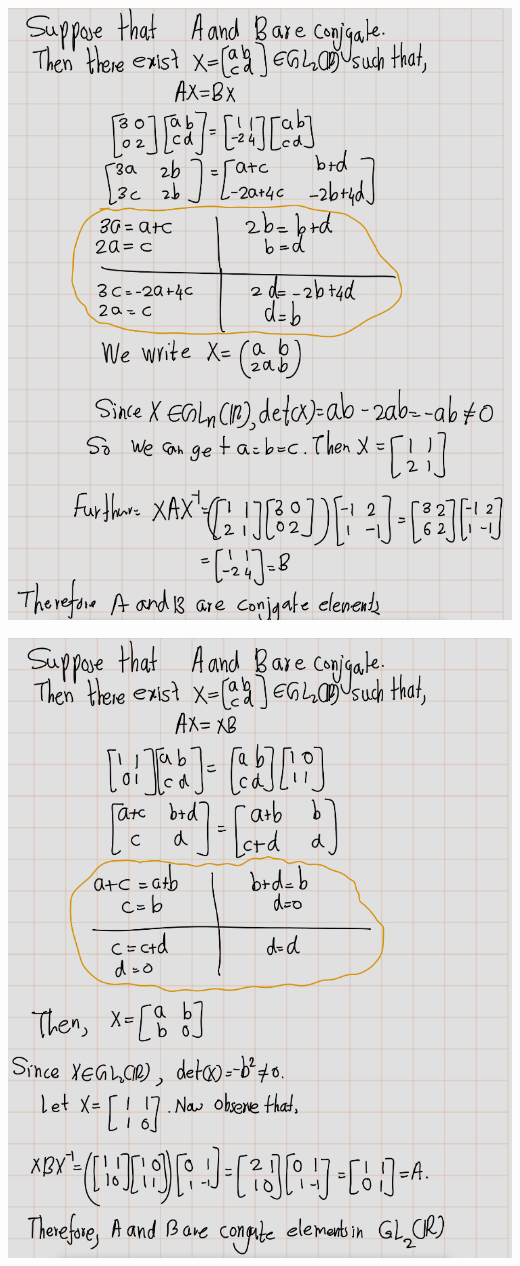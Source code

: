 \documentclass[
]{book}
\theoremstyle{definition}
\theoremstyle{definition}
\theoremstyle{definition}
\theoremstyle{definition}
\theoremstyle{remark}
\begin{document}
\includegraphics{figures/ch_2/fig84.png}

\includegraphics{figures/ch_2/fig85.png}
\end{document}
